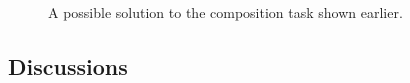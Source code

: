 \documentclass[conference]{IEEEtran}
\begin{document}
\begin{figure}
\centerline{
}
\caption{A possible solution to the composition task shown earlier.}
\label{fig:solution}
\end{figure}

\subsection{Discussions}
\end{document}
